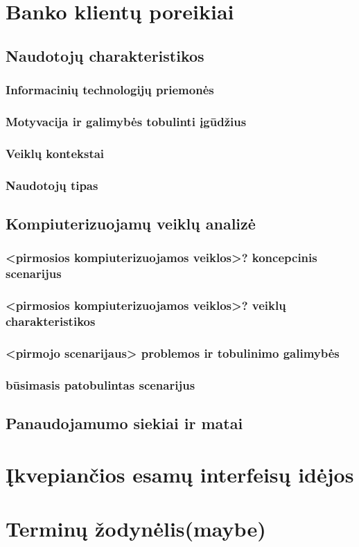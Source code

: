 \documentclass{VUMIFPSkursinis}
\begin{document}
\section{Banko klientų poreikiai}
  \subsection{Naudotojų charakteristikos}
  \subsubsection{Informacinių technologijų priemonės}
  \subsubsection{Motyvacija ir galimybės tobulinti įgūdžius}
  \subsubsection{Veiklų kontekstai}
  \subsubsection{Naudotojų tipas}
  \subsection{Kompiuterizuojamų veiklų analizė}
  \subsubsection{<pirmosios kompiuterizuojamos veiklos>? koncepcinis scenarijus}
  \subsubsection{<pirmosios kompiuterizuojamos veiklos>? veiklų charakteristikos}
  \subsubsection{<pirmojo scenarijaus> problemos ir tobulinimo galimybės}
  \subsubsection{būsimasis patobulintas scenarijus}
  \subsection{Panaudojamumo siekiai ir matai}
\section{Įkvepiančios esamų interfeisų idėjos}
\section{Terminų žodynėlis(maybe)}
\end{document}
